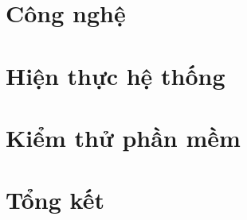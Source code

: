 \documentclass[a4paper, twoside, 12pt]{report}
\theoremstyle{definition}
\begin{document}
% 

% 
% 

% 

% 


\chapter{Công nghệ}



\chapter{Hiện thực hệ thống}



\chapter{Kiểm thử phần mềm}



\chapter{Tổng kết}





\end{document}
